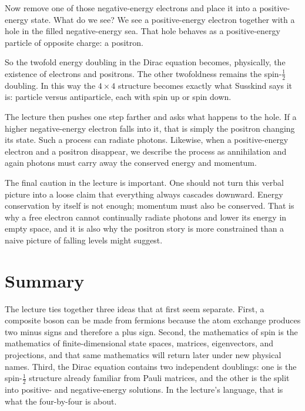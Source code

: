 Now remove one of those negative-energy electrons and place it into a positive-energy state. What do we see? We see a positive-energy electron together with a hole in the filled negative-energy sea. That hole behaves as a positive-energy particle of opposite charge: a positron.

So the twofold energy doubling in the Dirac equation becomes, physically, the existence of electrons and positrons. The other twofoldness remains the spin-\(\tfrac12\) doubling. In this way the \(4\times4\) structure becomes exactly what Susskind says it is: particle versus antiparticle, each with spin up or spin down.

The lecture then pushes one step farther and asks what happens to the hole. If a higher negative-energy electron falls into it, that is simply the positron changing its state. Such a process can radiate photons. Likewise, when a positive-energy electron and a positron disappear, we describe the process as annihilation and again photons must carry away the conserved energy and momentum.

The final caution in the lecture is important. One should not turn this verbal picture into a loose claim that everything always cascades downward. Energy conservation by itself is not enough; momentum must also be conserved. That is why a free electron cannot continually radiate photons and lower its energy in empty space, and it is also why the positron story is more constrained than a naive picture of falling levels might suggest.

\section{Summary}

The lecture ties together three ideas that at first seem separate. First, a composite boson can be made from fermions because the atom exchange produces two minus signs and therefore a plus sign. Second, the mathematics of spin is the mathematics of finite-dimensional state spaces, matrices, eigenvectors, and projections, and that same mathematics will return later under new physical names. Third, the Dirac equation contains two independent doublings: one is the spin-\(\tfrac12\) structure already familiar from Pauli matrices, and the other is the split into positive- and negative-energy solutions. In the lecture's language, that is what the four-by-four is about.